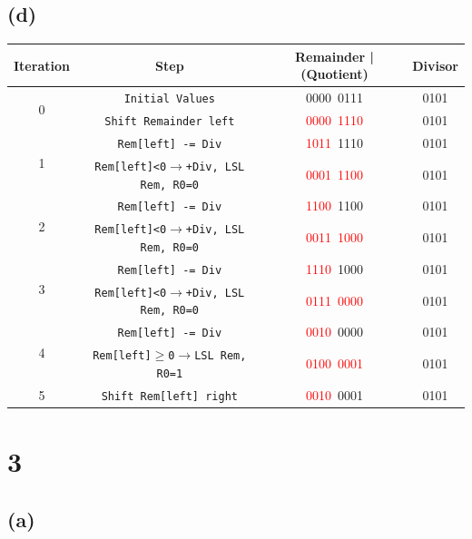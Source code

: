 \documentclass[12pt]{article}
\begin{document}
\subsection*{(d)}

\begin{table}[h!]
    \centering
    \begin{tabular}{|c|c|c|c|}
    \hline
    \textbf{Iteration} & \textbf{Step} & \textbf{Remainder | (Quotient)} & \textbf{Divisor}  \\
    \hline
    \multirow{2}{*}{0} 
    & \texttt{Initial Values} & 0000\ 0111 & 0101 \\
    \cline{2-4}
    & \texttt{Shift Remainder left} & \textcolor{red}{0000\ 1110} & 0101 \\
    \hline
    \multirow{2}{*}{1} 
    & \texttt{Rem[left] -= Div} & \textcolor{red}{1011}\ 1110 & 0101 \\
    \cline{2-4}
    & \texttt{Rem[left]<0$\rightarrow$+Div, LSL Rem, R0=0} & \textcolor{red}{0001\ 1100} & 0101 \\
    \hline
    \multirow{2}{*}{2} 
    & \texttt{Rem[left] -= Div} & \textcolor{red}{1100}\ 1100 & 0101 \\
    \cline{2-4}
    & \texttt{Rem[left]<0$\rightarrow$+Div, LSL Rem, R0=0} & \textcolor{red}{0011\ 1000} & 0101 \\
    \hline
    \multirow{2}{*}{3} 
    & \texttt{Rem[left] -= Div} & \textcolor{red}{1110}\ 1000 & 0101 \\
    \cline{2-4}
    & \texttt{Rem[left]<0$\rightarrow$+Div, LSL Rem, R0=0} & \textcolor{red}{0111\ 0000} & 0101 \\
    \hline
    \multirow{2}{*}{4} 
    & \texttt{Rem[left] -= Div} & \textcolor{red}{0010}\ 0000 & 0101 \\
    \cline{2-4}
    & \texttt{Rem[left]$\geq$0$\rightarrow$LSL Rem, R0=1} & \textcolor{red}{0100\ 0001} & 0101 \\
    \hline
    \multirow{1}{*}{5} 
    & \texttt{Shift Rem[left] right} & \textcolor{red}{0010}\ 0001 & 0101 \\
    \hline
    \end{tabular}
\end{table}

\clearpage

\section*{3}

\subsection*{(a)}
\end{document}
